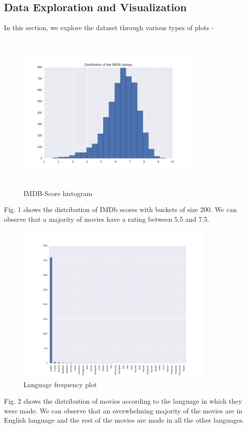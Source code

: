 \documentclass[conference]{IEEEtran}
\begin{document}
\subsection{Data Exploration and Visualization}
In this section, we explore the dataset through various types of plots -
\begin{figure}[H]
  \centering    
  \captionsetup{justification=centering}
  \includegraphics[height=8cm, width=9cm, trim={20mm 0mm 10mm 0mm},clip]{../visualizations/IMDB-Score-Histogram}
  \caption{IMDB-Score histogram}
  \label{fig:fig1}
\end{figure}
Fig. 1 shows the distribution of IMDb scores with buckets of size 200. We can observe that a majority of movies have a rating between 5.5 and 7.5.

\begin{figure}[H]
  \centering    
  \captionsetup{justification=centering}
  \includegraphics[height=8cm, width=10cm, trim={20mm 0mm 10mm 20mm},clip]{../visualizations/Language-Histogram}
  \caption{Language frequency plot}
  \label{fig:fig2}
\end{figure}
Fig. 2 shows the distribution of movies according to the language in which they were made. We can observe that an overwhelming majority of the movies are in English language and the rest of the movies are made in all the other languages.
\end{document}

